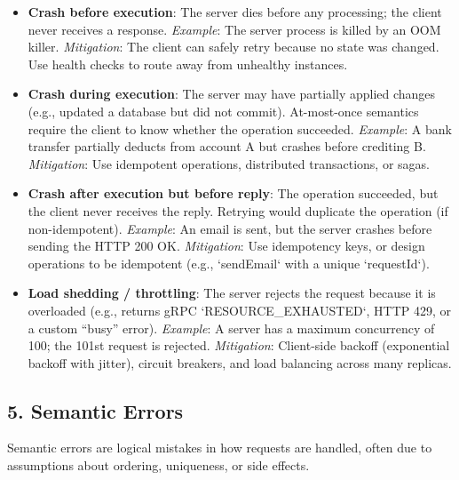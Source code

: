 \documentclass[10pt,a4paper]{article}
\begin{document}
\begin{itemize}
    \item \textbf{Crash before execution}: The server dies before any processing; the client never receives a response.  
        \textit{Example}: The server process is killed by an OOM killer.  
        \textit{Mitigation}: The client can safely retry because no state was changed. Use health checks to route away from unhealthy instances.
    
    \item \textbf{Crash during execution}: The server may have partially applied changes (e.g., updated a database but did not commit). At-most-once semantics require the client to know whether the operation succeeded.  
        \textit{Example}: A bank transfer partially deducts from account A but crashes before crediting B.  
        \textit{Mitigation}: Use idempotent operations, distributed transactions, or sagas.
    
    \item \textbf{Crash after execution but before reply}: The operation succeeded, but the client never receives the reply. Retrying would duplicate the operation (if non-idempotent).  
        \textit{Example}: An email is sent, but the server crashes before sending the HTTP 200 OK.  
        \textit{Mitigation}: Use idempotency keys, or design operations to be idempotent (e.g., `sendEmail` with a unique `requestId`).
    
    \item \textbf{Load shedding / throttling}: The server rejects the request because it is overloaded (e.g., returns gRPC `RESOURCE\_EXHAUSTED`, HTTP 429, or a custom “busy” error).  
        \textit{Example}: A server has a maximum concurrency of 100; the 101st request is rejected.  
        \textit{Mitigation}: Client-side backoff (exponential backoff with jitter), circuit breakers, and load balancing across many replicas.
\end{itemize}

\subsection{5. Semantic Errors}
Semantic errors are logical mistakes in how requests are handled, often due to assumptions about ordering, uniqueness, or side effects.
\end{document}
